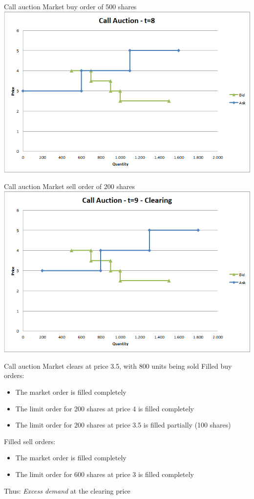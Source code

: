 \begin{frame}{Call auction}
	Market buy order of 500 shares
	\quad
	\center
	\includegraphics[width=.75\linewidth]{pics/Call_t8}
\end{frame}


\begin{frame}{Call auction}
	Market sell order of 200 shares
	\quad
	\center
	\includegraphics[width=.75\linewidth]{pics/Call_Clearing}
\end{frame}


\begin{frame}{Call auction}
	Market clears at price 3.5, with 800 units being sold
	Filled buy orders:
	\begin{itemize}
		\item The market order is filled completely
		\item The limit order for 200 shares at price 4 is filled completely
		\item The limit order for 200 shares at price 3.5 is filled partially (100 shares)
	\end{itemize}
	Filled sell orders:
	\begin{itemize}
		\item The market order is filled completely
		\item The limit order for 600 shares at price 3 is filled completely
	\end{itemize}
	Thus: \textit{Excess demand} at the clearing price
\end{frame}


